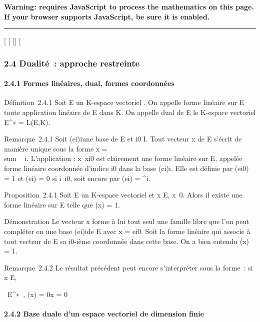 \textbf{Warning: 
requires JavaScript to process the mathematics on this page.\\ If your
browser supports JavaScript, be sure it is enabled.}

\begin{center}\rule{3in}{0.4pt}\end{center}

{[}
{[}
{[}{]}
{[}

\subsubsection{2.4 Dualité~: approche restreinte}

\paragraph{2.4.1 Formes linéaires, dual, formes coordonnées}

Définition~2.4.1 Soit E un K-espace vectoriel . On appelle forme
linéaire sur E toute application linéaire de E dans K. On appelle dual
de E le K-espace vectoriel E^∗ = L(E,K).

Remarque~2.4.1 Soit (ei)i\inI une base de E et
i0 \in I. Tout vecteur x de E s'écrit de manière unique sous la
forme x = \\sum ~
i\inIxiei. L'application
 :
x\mapsto~xi0 est clairement une
forme linéaire sur E, appelée forme linéaire coordonnée d'indice
i0 dans la base (ei)i\inI. Elle est définie
par (ei0) = 1 et
(ei) = 0 si
i\neq~i0, soit encore par
(ei) =
^i.

Proposition~2.4.1 Soit E un K-espace vectoriel et x \in E,
x\neq~0. Alors il existe une forme linéaire \phi sur
E telle que \phi(x) = 1.

Démonstration Le vecteur x forme à lui tout seul une famille libre que
l'on peut compléter en une base (ei)i\inI de E avec x
= ei0. Soit \phi la forme linéaire qui associe à tout
vecteur de E sa i0-ième coordonnée dans cette base. On a bien
entendu \phi(x) = 1.

Remarque~2.4.2 Le résultat précédent peut encore s'interpréter sous la
forme~: si x \in E,

\forall~\phi \in E^∗~, \phi(x) =
0\quad \Leftrightarrow x = 0

\paragraph{2.4.2 Base duale d'un espace vectoriel de dimension finie}

